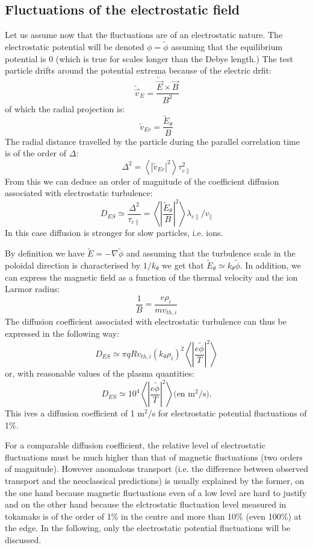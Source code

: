 		
				
				\subsection{Fluctuations of the electrostatic field}
				\label{FluctuationsDuChampElectrostatique}
		
		
Let us assume now that the fluctuations are of an electrostatic nature. The electrostatic potential will be denoted $\phi = \tilde{\phi}$ assuming that the equilibrium potential is 0 (which is true for scales longer than the Debye length.) The test particle drifts around the potential extrema because of the electric drfit:
\[
		\tilde{\vec{v}}_E = \frac{\tilde{\vec{E}} \times \vec{B}}{B^2}
\]
of which the radial projection is:
\[
		\tilde{v}_{Er} = \frac{\tilde{E}_{\theta}}{B}
\]
The radial distance travelled by the particle during the parallel correlation time is of the order of $\Delta$:
\[
		\Delta^2 = \left< |\tilde{v}_{Er}|^2\right>\tau_{c\|}^2
\]
From this we can deduce an order of magnitude of the coefficient diffusion associated with electrostatic turbulence:
\[
		D_{ES} \simeq \frac{\Delta^2}{\tau_{c\|}} = \left< \left| \frac{\tilde{E}_\theta}{B} \right|^2 \right> \lambda_{c\|}/v_\|
\]
In this case diffusion is stronger for slow particles, i.e. ions.

By definition we have $\tilde{E} = -\nabla \tilde{\phi}$ and assuming that the turbulence scale in the poloidal direction is characterised by $1/k_\theta$ we get that $\tilde{E}_\theta \simeq k_\theta \tilde{\phi}$. In addition, we can express the magnetic field as a function of the thermal velocity and the ion Larmor radius:
\[
		\frac{1}{B} = \frac{e\rho_i}{mv_{th,i}}
\] 
The diffusion coefficient associated with electrostatic turbulence can thus be expressed in the following way:
\[
		D_{ES} \simeq \pi q R v_{th,i}(k_\theta \rho_i)^2 \left< \left| \frac{e \tilde{\phi}}{T} \right|^2 \right>
\]
or, with reasonable values of the plasma quantities:
\[
		D_{ES} \simeq 10^4 \left< \left| \frac{e \tilde{\phi}}{T} \right|^2 \right>		\mbox{(en m$^2$/s)}.
\]
This ives a diffusion coefficient of 1 m$^2$/s for electrostatic potential fluctuations of 1\%. 

For a comparable diffusion coefficient, the relative level of electrostatic fluctuations must be much higher than that of magnetic fluctuations (two orders of magnitude). However anomalous transport (i.e. the difference between observed transport and the neoclassical predictions) is usually explained by the former, on the one hand because magnetic fluctuations even of a low level are hard to justify and on the other hand because the elctrostatic fluctuation level measured in tokamaks is of the order of 1\% in the centre and more than 10\% (even 100\%) at the edge. In the following, only the electrostatic potential fluctuations will be discussed.

